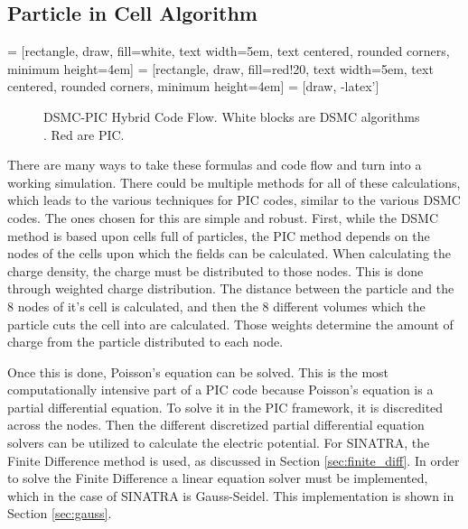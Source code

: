 \subsection{Particle in Cell Algorithm}


 = [rectangle, draw, fill=white, 
    text width=5em, text centered, rounded corners, minimum height=4em]
 = [rectangle, draw, fill=red!20, 
    text width=5em, text centered, rounded corners, minimum height=4em]
 = [draw, -latex']

\begin{figure}
\centering
    \label{fig:pic_flow}
    \caption{DSMC-PIC Hybrid Code Flow. White blocks are DSMC algorithms \cite{Galvez2018a}. Red are PIC. }
\end{figure}

There are many ways to take these formulas and code flow and turn into a working simulation.  There could be multiple methods for all of these calculations, which leads to the various techniques for PIC codes, similar to the various DSMC codes. The ones chosen for this are simple and robust. First, while the DSMC method is based upon cells full of particles, the PIC method depends on the nodes of the cells upon which the fields can be calculated. When calculating the charge density, the charge must be distributed to those nodes. This is done through weighted charge distribution. The distance between the particle and the 8 nodes of it's cell is calculated, and then the 8 different volumes which the particle cuts the cell into are calculated. Those weights determine the amount of charge from the particle distributed to each node. \par

\indent Once this is done, Poisson's equation can be solved. This is the most computationally intensive part of a PIC code because Poisson's equation is a partial differential equation. To solve it in the PIC framework, it is discredited across the nodes. Then the different discretized partial differential equation solvers can be utilized to calculate the electric potential. For SINATRA, the Finite Difference method is used, as discussed in Section \ref{sec:finite_diff}. In order to solve the Finite Difference a linear equation solver must be implemented, which in the case of SINATRA is Gauss-Seidel. This implementation is shown in Section \ref{sec:gauss}. \par

